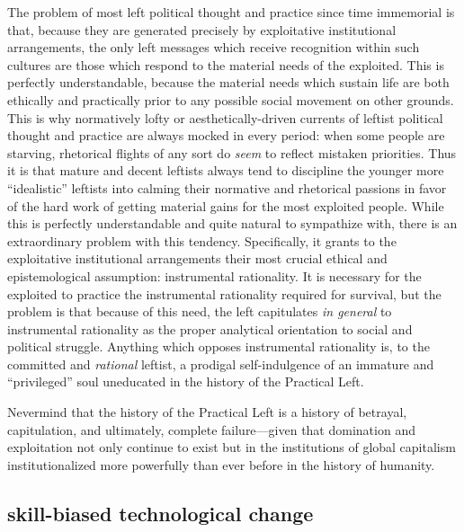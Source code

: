 \documentclass[12pt,book]{article}
\begin{document}
The problem of most left political thought and practice since time
immemorial is that, because they are generated precisely by exploitative
institutional arrangements, the only left messages which receive
recognition within such cultures are those which respond to the material
needs of the exploited. This is perfectly understandable, because the
material needs which sustain life are both ethically and practically
prior to any possible social movement on other grounds. This is why
normatively lofty or aesthetically-driven currents of leftist political
thought and practice are always mocked in every period: when some people
are starving, rhetorical flights of any sort do \emph{seem} to reflect
mistaken priorities. Thus it is that mature and decent leftists always
tend to discipline the younger more ``idealistic'' leftists into calming
their normative and rhetorical passions in favor of the hard work of
getting material gains for the most exploited people. While this is
perfectly understandable and quite natural to sympathize with, there is
an extraordinary problem with this tendency. Specifically, it grants to
the exploitative institutional arrangements their most crucial ethical
and epistemological assumption: instrumental rationality. It is
necessary for the exploited to practice the instrumental rationality
required for survival, but the problem is that because of this need, the
left capitulates \emph{in general} to instrumental rationality as the
proper analytical orientation to social and political struggle. Anything
which opposes instrumental rationality is, to the committed and
\emph{rational} leftist, a prodigal self-indulgence of an immature and
``privileged'' soul uneducated in the history of the Practical Left.

Nevermind that the history of the Practical Left is a history of
betrayal, capitulation, and ultimately, complete failure---given that
domination and exploitation not only continue to exist but in the
institutions of global capitalism institutionalized more powerfully than
ever before in the history of humanity.

\subsection{skill-biased technological
change}\label{skill-biased-technological-change}
\end{document}
